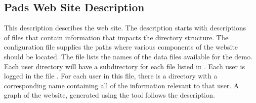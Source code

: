 \subsection{Pads Web Site Description}
This \forest{} description describes the \pads{} web site. The
description starts with \pads{} descriptions of files that contain
information that impacts the directory structure. The
configuration file supplies the paths where various components of the
website should be located.  The  file lists the names
of the data files available for the demo.  Each user directory will
have a subdirectory for each file listed in . Each
user is logged in the file .  For each user in this
file, there is a directory with a corresponding name containing all of
the information relevant to that user.  A graph
of the \pads{} website, generated using the  tool
follows the description.

\newpage
